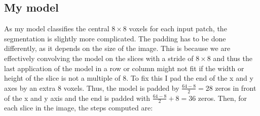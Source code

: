 \documentclass[12pt,a4paper,twoside,openright]{report}
\begin{document}
\subsection{My model}
As my model classifies the central $8 \times 8$ voxels for each input patch, the segmentation is slightly more complicated. The padding has to be done differently, as it depends on the size of the image. This is because we are effectively convolving the model on the slices with a stride of $8 \times 8$ and thus the last application of the model in a row or column might not fit if the width or height of the slice is not a multiple of 8. To fix this I pad the end of the x and y axes by an extra 8 voxels. Thus, the model is padded by $\frac{64 - 8}{2} = 28$ zeros in front of the x and y axis and the end is padded with $\frac{64 -8}{2} + 8 = 36$ zeros. Then, for each slice in the image, the steps computed are:
\end{document}
